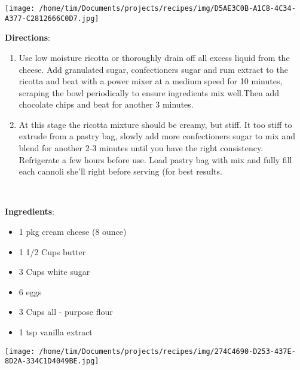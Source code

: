 \documentclass[11pt, twoside, openany]{book}
\begin{document}
\begin{minipage}[t]{0.2\linewidth}
\centering \strut\vspace*{-\baselineskip}\newline
\texttt{[image: /home/tim/Documents/projects/recipes/img/D5AE3C0B-A1C8-4C34-A377-C2812666C0D7.jpg]}\\
\end{minipage}\vspace{3mm}
\textbf{Directions}:
\vspace{-3mm}\begin{enumerate}\setlength\itemsep{-1mm}
\item Use low moisture ricotta or thoroughly drain off all excess liquid from the cheese. Add granulated sugar, confectioners sugar and rum extract to the ricotta and beat with a power mixer at a medium speed for 10 minutes, scraping the bowl periodically to ensure ingredients mix well.Then add chocolate chips and beat for another 3 minutes. 
\item At this stage the ricotta mixture should be creamy, but stiff. It too stiff to extrude from a pastry bag, slowly add more confectioners sugar to mix and blend for another 2-3 minutes until you have the right consistency. Refrigerate a few hours before use. Load pastry bag with mix and fully fill each cannoli she'll right before serving (for best results.
\end{enumerate}
 \label{cream-cheese-pound-cake-iii}\hfill\textit{}\\
\begin{minipage}[t]{0.8\linewidth}
\textbf{Ingredients}:\vspace{-3mm}
\begin{multicols}{2}
\begin{itemize}\setlength\itemsep{-1mm}
\item 1 pkg cream cheese (8 ounce)
\item 1 1/2 Cups butter
\item 3 Cups white sugar
\item 6 eggs
\item 3 Cups all - purpose flour
\item 1 tsp vanilla extract
\end{itemize}
\end{multicols}
\end{minipage}
\begin{minipage}[t]{0.2\linewidth}
\centering \strut\vspace*{-\baselineskip}\newline
\texttt{[image: /home/tim/Documents/projects/recipes/img/274C4690-D253-437E-8D2A-334C1D4049BE.jpg]}\\
\end{minipage}\vspace{3mm}
\end{document}
